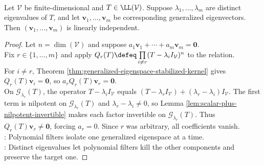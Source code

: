 \begin{theorem} \label{thm:distinct-generalized-eigenvectors-independent} \\
Let $\mathcal{V}$ be finite-dimensional and $T\in\LL(\mathcal{V})$. Suppose $\lambda_1,\ldots,\lambda_m$ are distinct eigenvalues of $T$, and let $\mathbf{v}_1,\ldots,\mathbf{v}_m$ be corresponding generalized eigenvectors. Then $(\mathbf{v}_1,\ldots,\mathbf{v}_m)$ is linearly independent.
\begin{proof}
Let $n=\dim(\mathcal{V})$ and suppose $a_1\mathbf{v}_1+\cdots+a_m\mathbf{v}_m=\mathbf{0}$.\\
Fix $r\in\{1,\ldots,m\}$ and apply $Q_r(T)\defeq\prod\limits_{i\neq r}(T-\lambda_iI_{\mathcal{V}})^n$ to the relation.\\
For $i\neq r$, Theorem \ref{thm:generalized-eigenspace-stabilized-kernel} gives $Q_r(T)\mathbf{v}_i=\mathbf{0}$, so $a_rQ_r(T)\mathbf{v}_r=\mathbf{0}$.\\
On $\mathcal{G}_{\lambda_r}(T)$, the operator $T-\lambda_iI_{\mathcal{V}}$ equals $(T-\lambda_rI_{\mathcal{V}})+(\lambda_r-\lambda_i)I_{\mathcal{V}}$. The first term is nilpotent on $\mathcal{G}_{\lambda_r}(T)$ and $\lambda_r-\lambda_i\neq0$, so Lemma \ref{lem:scalar-plus-nilpotent-invertible} makes each factor invertible on $\mathcal{G}_{\lambda_r}(T)$. Thus $Q_r(T)\mathbf{v}_r\neq\mathbf{0}$, forcing $a_r=0$. Since $r$ was arbitrary, all coefficients vanish.\\
: Polynomial filters isolate one generalized eigenspace at a time.\\
: Distinct eigenvalues let polynomial filters kill the other components and preserve the target one.
\end{proof}
\end{theorem}

